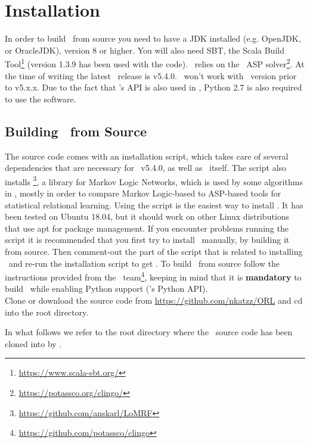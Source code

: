 \section{Installation}
\label{sec:install}
In order to build \trail \ from source you need to have a JDK installed (e.g. OpenJDK, or OracleJDK), version 8 or higher. You will also need SBT, the Scala Build Tool\footnote{\url{https://www.scala-sbt.org/}} (version 1.3.9 has been used with the code). \trail \ relies on the \clingo \ ASP solver\footnote{\url{https://potassco.org/clingo/}}. At the time of writing the latest \clingo \ release is v5.4.0. \trail \ won't work with \clingo \ version prior to v5.x.x. Due to the fact that \clingo's API is also used in \trail, Python 2.7 is also required to use the software.  

\subsection{Building \trail \ from Source}

The source code comes with an installation script, which takes care of several dependencies that are necessary for \clingo \ v5.4.0, as well as \clingo \ itself. The script also installs \lomrf\footnote{\url{https://github.com/anskarl/LoMRF}}, a library for Markov Logic Networks, which is used by some algorithms in \trail, mostly in order to compare Markov Logic-based to ASP-based tools for statistical relational learning. Using the script is the easiest way to install \trail. It has been tested on Ubuntu 18.04, but it should work on other Linux distributions that use apt for package management. If you encounter problems running the script it is recommended that you first try to install \clingo \ manually, by building it from source. Then comment-out the part of the script that is related to installing \clingo \ and re-run the installation script to get \lomrf. To build \clingo \ from source follow the instructions provided from the \clingo \ team\footnote{\url{https://github.com/potassco/clingo}}, keeping in mind that it is \textbf{mandatory} to build \clingo \ while enabling Python support (\clingo's Python API). \\

\noindent Clone or download the source code from \url{https://github.com/nkatzz/ORL} and cd into the root directory. 

\begin{remark}
	In what follows we refer to the root directory where the \trail \ source code has been cloned into by \textbf{\trailhome}.
\end{remark}


